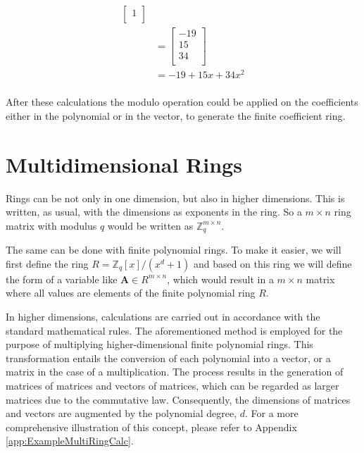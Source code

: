 \begin{align*}
{\begin{bmatrix}
                1  \\
              \end{bmatrix}
  }                                                                           \\
                 & = \begin{bmatrix}
                       -19 \\
                       15  \\
                       34  \\
                     \end{bmatrix}                                          \\
                 & = -19+15x+34x^2                                            \\                     
\end{align*}

After these calculations the modulo operation could be applied on the coefficients either in the polynomial or in the vector, to generate the finite coefficient ring.

\section{Multidimensional Rings}

Rings can be not only in one dimension, but also in higher dimensions. This is written, as usual, with the dimensions as exponents in the ring. So a $m \times n$ ring matrix with modulus $q$ would be written as $\mathbb{Z}^{m\times n}_q$.

The same can be done with finite polynomial rings. To make it easier, we will first define the ring $R = \mathbb{Z}_q[x]/(x^d+1)$ and based on this ring we will define the form of a variable like $\textbf{A} \in R^{m\times n}$, which would result in a $m \times n$ matrix where all values are elements of the finite polynomial ring $R$.

In higher dimensions, calculations are carried out in accordance with the standard mathematical rules. The aforementioned method is employed for the purpose of multiplying higher-dimensional finite polynomial rings. This transformation entails the conversion of each polynomial into a vector, or a matrix in the case of a multiplication. The process results in the generation of matrices of matrices and vectors of matrices, which can be regarded as larger matrices due to the commutative law. Consequently, the dimensions of matrices and vectors are augmented by the polynomial degree, $d$. For a more comprehensive illustration of this concept, please refer to Appendix \ref{app:ExampleMultiRingCalc}.
